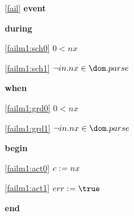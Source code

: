 \noindent \ref{fail}  \textbf{event}
\begin{block}
  \item   \textbf{during}
  \begin{block}
  \item[ \eqref{failm1:sch0} ]{$0 < nx$} %
  \item[ \eqref{failm1:sch1} ]{$\neg in.nx \in \dom.parse$} %
  \end{block}
  \item   \textbf{when}
  \begin{block}
  \item[ \eqref{failm1:grd0} ]{$0 < nx$} %
  \item[ \eqref{failm1:grd1} ]{$\neg in.nx \in \dom.parse$} %
  \end{block}
  \item   \textbf{begin}
  \begin{block}
  \item[ \eqref{failm1:act0} ]{$c \mathrel{:\mkern1mu=} nx$} %
  \item[ \eqref{failm1:act1} ]{$err \bcmeq \true$} %
  \end{block}
  \item   \textbf{end} \\
\end{block}

